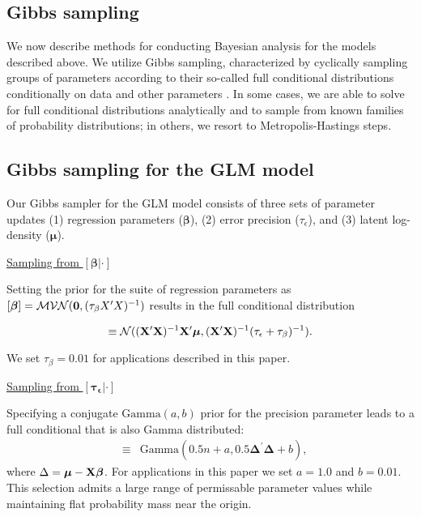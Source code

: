 \documentclass[12pt,fleqn]{article}
\begin{document}
\begin{flushleft}
\section{Gibbs sampling}

We now describe methods for conducting Bayesian analysis for the models described above.  We utilize Gibbs sampling, characterized by cyclically sampling groups of parameters according to their so-called full conditional distributions conditionally on data and other parameters \citep{GelmanEtAl2004}.  In some cases, we are able to solve for full conditional distributions analytically and to sample from known families of probability distributions; in others, we resort to Metropolis-Hastings steps.

\subsection{Gibbs sampling for the GLM model}

Our Gibbs sampler for the GLM model consists of three sets of parameter updates (1) regression parameters ($\boldsymbol{\beta}$), (2) error precision ($\tau_\epsilon$), and (3) latent log-density ($\boldsymbol{\mu}$).

\underline{Sampling from $[\boldsymbol{\beta}|\cdot]$}

Setting the prior for the suite of regression parameters as $[\boldsymbol{\beta}] = \mathcal{MVN}({\bf 0},(\tau_\beta X^\prime X)^{-1})$ results in the full conditional distribution
\begin{linenomath*}
\begin{equation*}
   [\boldsymbol{\beta} | \cdot] \equiv \mathcal{N}(({\bf X}^\prime {\bf X})^{-1}{\bf X}^\prime \boldsymbol{\mu},({\bf X}^\prime {\bf X})^{-1} (\tau_\epsilon + \tau_\beta)^{-1}).
\end{equation*}
\end{linenomath*}
We set $\tau_\beta = 0.01$ for applications described in this paper.

\underline{Sampling from $[\boldsymbol{\tau_\epsilon}|\cdot]$}

Specifying a conjugate $\text{Gamma}(a,b)$ prior for the precision parameter leads to a full conditional that is also Gamma distributed:
\begin{eqnarray}
  [\tau_\epsilon | \cdot] & \equiv & \textrm{Gamma}(0.5n + a,0.5 \boldsymbol{\Delta}^\prime \boldsymbol{\Delta} +b),
  \label{eq:tau_eps}
\end{eqnarray}
where $\Delta = \boldsymbol{\mu}-{\bf X}\boldsymbol{\beta}$.  For applications in this paper we set $a=1.0$ and $b=0.01$.  This selection admits a large range of permissable parameter values while maintaining flat probability mass near the origin.


\end{flushleft}
\end{document}

